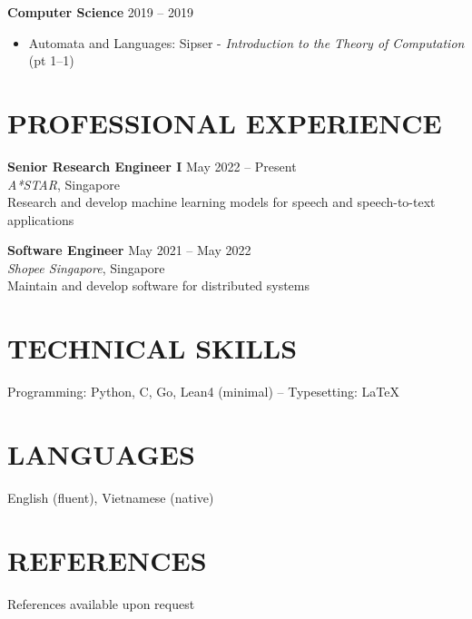 \documentclass[11pt]{article}
\begin{document}
\textbf{Computer Science} \hfill 2019 -- 2019

\begin{itemize}[topsep=0pt, partopsep=0pt, itemsep=0pt, parsep=0pt]
	\item Automata and Languages: Sipser - \textit{Introduction to the Theory of Computation} (pt 1--1)
\end{itemize}

\vspace{-0.3cm}
\section*{PROFESSIONAL EXPERIENCE}

\textbf{Senior Research Engineer I} \hfill May 2022 -- Present \\
\textit{A*STAR}, Singapore \\
Research and develop machine learning models for speech and speech-to-text applications

\textbf{Software Engineer} \hfill May 2021 -- May 2022 \\
\textit{Shopee Singapore}, Singapore \\
Maintain and develop software for distributed systems


\vspace{-0.3cm}
\section*{TECHNICAL SKILLS}

Programming: Python, C, Go, Lean4 (minimal) -- Typesetting: \LaTeX

\vspace{-0.3cm}
\section*{LANGUAGES}

English (fluent), Vietnamese (native)

\vspace{-0.3cm}
\section*{REFERENCES}

References available upon request
\end{document}
